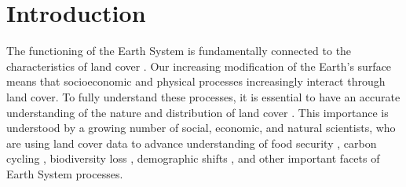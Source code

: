 \documentclass[12 pt, titlepage, a4paper]{article}
\begin{document}
\linenumbers

\section*{Introduction}
\vspace{-0.3 cm}
The functioning of the Earth System is fundamentally connected to the characteristics of land cover \citep{lambin_modelling_1997}. Our increasing modification of the Earth's surface \citep{lambin_dynamics_2003} means that socioeconomic and physical processes increasingly interact through land cover. To fully understand these processes, it is essential to have an accurate understanding of the nature and distribution of land cover \citep{verburg_challenges_2011}. This importance is understood by a growing number of social, economic, and natural scientists, who are using land cover data to advance understanding of food security \citep{lark_cropland_2015,wright_recent_2013, licker_mind_2010}, carbon cycling \citep{asner_high-resolution_2010, gaveau_major_2014}, biodiversity loss \citep{newbold_global_2015, luoto_predicting_2004}, demographic shifts \citep{linard_assessing_2010}, and other important facets of Earth System processes. 
\end{document}
